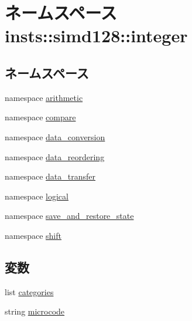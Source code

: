 \hypertarget{namespaceinsts_1_1simd128_1_1integer}{
\section{ネームスペース insts::simd128::integer}
\label{namespaceinsts_1_1simd128_1_1integer}
}
\subsection*{ネームスペース}
\begin{DoxyCompactItemize}
\item 
namespace \hyperlink{namespaceinsts_1_1simd128_1_1integer_1_1arithmetic}{arithmetic}
\item 
namespace \hyperlink{namespaceinsts_1_1simd128_1_1integer_1_1compare}{compare}
\item 
namespace \hyperlink{namespaceinsts_1_1simd128_1_1integer_1_1data__conversion}{data\_\-conversion}
\item 
namespace \hyperlink{namespaceinsts_1_1simd128_1_1integer_1_1data__reordering}{data\_\-reordering}
\item 
namespace \hyperlink{namespaceinsts_1_1simd128_1_1integer_1_1data__transfer}{data\_\-transfer}
\item 
namespace \hyperlink{namespaceinsts_1_1simd128_1_1integer_1_1logical}{logical}
\item 
namespace \hyperlink{namespaceinsts_1_1simd128_1_1integer_1_1save__and__restore__state}{save\_\-and\_\-restore\_\-state}
\item 
namespace \hyperlink{namespaceinsts_1_1simd128_1_1integer_1_1shift}{shift}
\end{DoxyCompactItemize}
\subsection*{変数}
\begin{DoxyCompactItemize}
\item 
list \hyperlink{namespaceinsts_1_1simd128_1_1integer_a273cf0f1630af14c1582f05e53354a55}{categories}
\item 
string \hyperlink{namespaceinsts_1_1simd128_1_1integer_a770f11a173e99389a8802f0107ed8f52}{microcode}
\end{DoxyCompactItemize}


